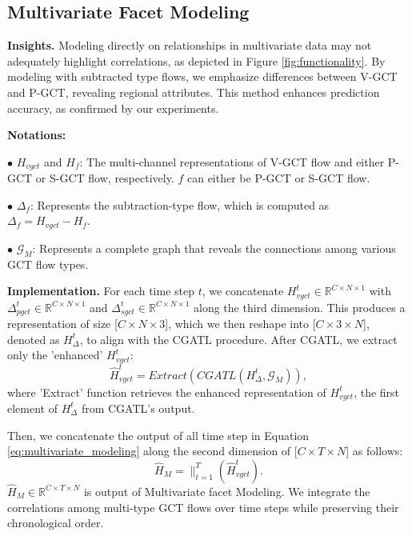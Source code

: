 \documentclass[letterpaper]{article} %
\begin{document}
\subsection{Multivariate Facet Modeling}
\label{multivariate_view_modeling}
\noindent \textbf{Insights.}
Modeling directly on relationships in multivariate data may not adequately highlight correlations, as depicted in Figure \ref{fig:functionality}. By modeling with subtracted type flows, we emphasize differences between V-GCT and P-GCT, revealing regional attributes. This method enhances prediction accuracy, as confirmed by our experiments.

\noindent \textbf{Notations:}

$\bullet$ $H_{vgct}$ and $H_{f}$: The multi-channel representations of V-GCT flow and either P-GCT or S-GCT flow, respectively. $f$ can either be P-GCT or S-GCT flow.

$\bullet$ $\Delta_{f}$: Represents the subtraction-type flow, which is computed as $\Delta_{f} = H_{vgct} - H_{f}$.

$\bullet$ $\mathcal{G}_{M}$: Represents a complete graph that reveals the connections among various GCT flow types.


\noindent \textbf{Implementation.}
For each time step $t$, we concatenate $H_{vgct}^{t} \in \mathbb{R}^{C \times N \times 1} $ with $\Delta_{pgct}^{t} \in \mathbb{R}^{C \times N \times 1}$ and $\Delta_{sgct}^{t} \in \mathbb{R}^{C \times N \times 1}$ along the third dimension. This produces a representation of size [$C \times N \times 3 $], which we then reshape into [$C \times 3 \times N $], denoted as $H_{\Delta}^{t}$, to align with the CGATL procedure. After CGATL, we extract only the 'enhanced' $H_{vgct}^{t}$:
\begin{equation}
\hat{H}_{vgct}^{t} = Extract( CGATL(H_{\Delta}^{t},\mathcal{G}_{M})),
\label{eq:multivariate_modeling}
\end{equation}
where 'Extract' function retrieves the enhanced representation of $H_{vgct}^{t}$, the first element of $H_{\Delta}^{t}$ from CGATL's output. 

Then, we concatenate the output of all time step in Equation \ref{eq:multivariate_modeling} along the second dimension of [$C \times T \times N$] as follows:
\begin{equation}
\hat{H}_{M}=\|_{t=1}^{T}(\hat{H}_{vgct}^{t}).
\label{eq:temporal_concat}
\end{equation}
$\hat{H}_{M} \in \mathbb{R}^{C \times T \times N}$ is output of Multivariate facet Modeling. We integrate the correlations among multi-type GCT flows over time steps while preserving their chronological order.
\end{document}
